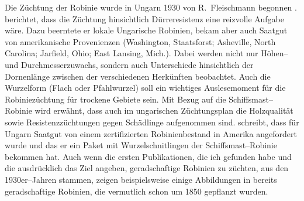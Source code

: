 \documentclass[twocolumn]{scrartcl}
\begin{document}
Die Züchtung der Robinie wurde in Ungarn 1930 von R.~Fleischmann
begonnen \citep{keresztesi1983robinie}. \cite{fleischmann1933robinie}
berichtet, dass die Züchtung hinsichtlich Dürreresistenz eine
reizvolle Aufgabe wäre. Dazu beerntete er lokale Ungarische Robinien,
bekam aber auch Saatgut von amerikanische Provenienzen (Washington,
Staatsforst; Asheville, North Carolina; Jarfield, Ohio; East Lansing,
Mich.). %
Dabei werden nicht nur Höhen-- und Durchmesserzuwachs, sondern auch
Unterschiede hinsichtlich der Dornenlänge zwischen der verschiedenen
Herkünften beobachtet.
Auch die Wurzelform (Flach oder Pfahlwurzel) soll ein wichtiges Auslesemoment
für die Robiniezüchtung für trockene Gebiete sein. Mit Bezug auf die
Schiffsmast--Robinie \citep{raber1936shipmast} wird erwähnt, dass auch im
ungarischen Züchtungsplan die Holzqualität sowie Resistenzzüchtungen gegen
Schädlinge aufgenommen sind. \cite{mihalyi1937robinie} schreibt, dass für Ungarn
Saatgut von einem zertifizierten Robinienbestand in Amerika angefordert wurde
und das er ein Paket mit Wurzelschnitlingen der Schiffsmast--Robinie bekommen
hat. Auch wenn die ersten Publikationen, die ich gefunden habe und die
ausdrücklich das Ziel angeben, geradschaftige Robinien zu züchten, aus den
1930er--Jahren stammen, zeigen beispielsweise einige Abbildungen in
\cite{vadas1911robinie} bereits geradschaftige Robinien, die vermutlich schon um
1850 gepflanzt wurden.
\end{document}
